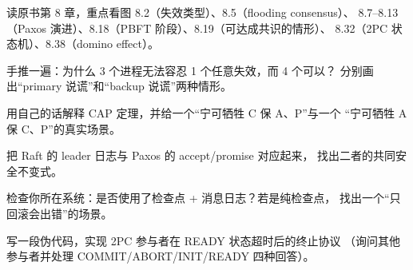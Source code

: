 \begin{actions}
  \item 读原书第 8 章，重点看图 8.2（失效类型）、8.5（flooding consensus）、
        8.7–8.13（Paxos 演进）、8.18（PBFT 阶段）、8.19（可达成共识的情形）、
        8.32（2PC 状态机）、8.38（domino effect）。
  \item 手推一遍：为什么 3 个进程无法容忍 1 个任意失效，而 4 个可以？
        分别画出“primary 说谎”和“backup 说谎”两种情形。
  \item 用自己的话解释 CAP 定理，并给一个“宁可牺牲 C 保 A、P”与一个
        “宁可牺牲 A 保 C、P”的真实场景。
  \item 把 Raft 的 leader 日志与 Paxos 的 accept/promise 对应起来，
        找出二者的共同安全不变式。
  \item 检查你所在系统：是否使用了检查点 + 消息日志？若是纯检查点，
        找出一个“只回滚会出错”的场景。
  \item 写一段伪代码，实现 2PC 参与者在 READY 状态超时后的终止协议
        （询问其他参与者并处理 COMMIT/ABORT/INIT/READY 四种回答）。
\end{actions}
